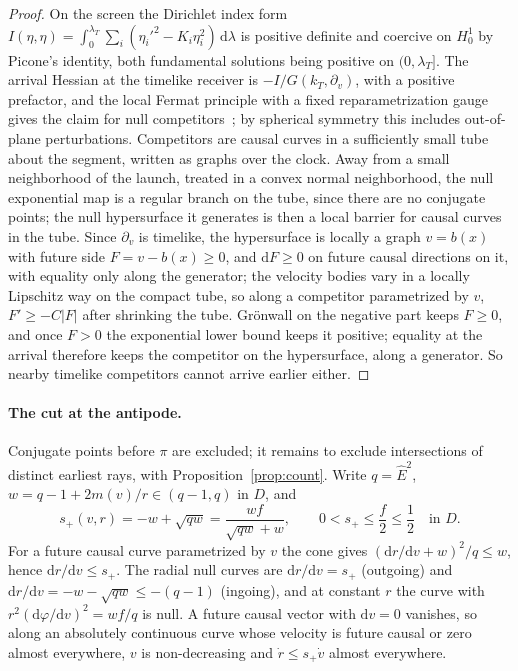 \documentclass[aip,jmp,amsmath,amssymb,reprint]{revtex4-2}
\newcommand{\Ehat}{\hat E}
\newcommand{\dd}{\mathrm{d}}
\theoremstyle{plain}
\theoremstyle{definition}
\begin{document}
\begin{proof}
On the screen the Dirichlet index form
$I(\eta,\eta)=\int_0^{\lambda_T}\sum_i(\eta_i'^2-K_i\eta_i^2)\,\dd\lambda$ is positive definite and
coercive on $H^1_0$ by Picone's identity, both fundamental solutions being positive on
$(0,\lambda_T]$. The arrival Hessian at the timelike receiver is $-I/G(k_T,\partial_v)$, with a
positive prefactor, and the local Fermat principle with a fixed reparametrization gauge gives
the claim for null competitors~\cite{GiannoniMasielloPiccioneFermat}; by spherical symmetry this
includes out-of-plane perturbations. Competitors are causal curves in a sufficiently small tube about the segment, written as graphs over the clock.
Away from a small neighborhood of the launch, treated in a convex normal neighborhood, the null exponential map is a
regular branch on the tube, since there are no conjugate points; the null hypersurface it generates is then a local
barrier for causal curves in the tube. Since $\partial_v$ is timelike, the hypersurface is locally a graph $v=b(x)$ with
future side $F=v-b(x)\ge0$, and $\dd F\ge0$ on future causal directions on it, with equality only along the generator;
the velocity bodies vary in a locally Lipschitz way on the compact tube, so along a competitor parametrized by $v$,
$F'\ge-C|F|$ after shrinking the tube. Gr\"onwall on the negative part keeps $F\ge0$, and once $F>0$ the exponential
lower bound keeps it positive; equality at the arrival therefore keeps the competitor on the hypersurface, along a
generator. So nearby timelike competitors cannot arrive
earlier either.
\end{proof}

\paragraph{The cut at the antipode.} Conjugate points before $\pi$ are excluded; it remains to
exclude intersections of distinct earliest rays, with Proposition~\ref{prop:count}. Write $q=\Ehat^2$,
$w=q-1+2m(v)/r\in(q-1,q)$ in $D$, and
\[
  s_+(v,r)=-w+\sqrt{qw}=\frac{wf}{\sqrt{qw}+w},\qquad 0<s_+\le\frac f2\le\frac12 \quad\text{in } D .
\]
For a future causal curve parametrized by $v$ the cone gives $(\dd r/\dd v+w)^2/q\le w$, hence
$\dd r/\dd v\le s_+$. The radial null curves are $\dd r/\dd v=s_+$ (outgoing) and
$\dd r/\dd v=-w-\sqrt{qw}\le-(q-1)$ (ingoing), and at constant $r$ the curve with
$r^2(\dd\varphi/\dd v)^2=wf/q$ is null. A future causal vector with $\dd v=0$ vanishes, so along an
absolutely continuous curve whose velocity is future causal or zero almost everywhere, $v$ is
non-decreasing and $\dot r\le s_+\dot v$ almost everywhere.
\end{document}
